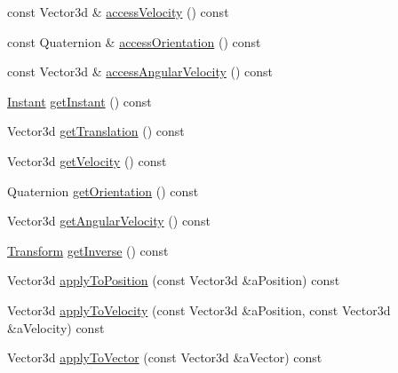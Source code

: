 \begin{DoxyCompactItemize}
\item 
const Vector3d \& \hyperlink{classlibrary_1_1physics_1_1coord_1_1_transform_a376d079de305b16e05251bfe84ca2199}{access\+Velocity} () const
\item 
const Quaternion \& \hyperlink{classlibrary_1_1physics_1_1coord_1_1_transform_aac7f3bf9570d378aab4e9c62f3478560}{access\+Orientation} () const
\item 
const Vector3d \& \hyperlink{classlibrary_1_1physics_1_1coord_1_1_transform_a0e7dc9e3c40a5e3b836ccb10e250d207}{access\+Angular\+Velocity} () const
\item 
\hyperlink{classlibrary_1_1physics_1_1time_1_1_instant}{Instant} \hyperlink{classlibrary_1_1physics_1_1coord_1_1_transform_a674c8ac4676d07aa641b85e049233838}{get\+Instant} () const
\item 
Vector3d \hyperlink{classlibrary_1_1physics_1_1coord_1_1_transform_a9cdc57080aff638c321de68564bf913b}{get\+Translation} () const
\item 
Vector3d \hyperlink{classlibrary_1_1physics_1_1coord_1_1_transform_aa5d6b48208919b34cdafb9ea56aaef12}{get\+Velocity} () const
\item 
Quaternion \hyperlink{classlibrary_1_1physics_1_1coord_1_1_transform_a401692acc8f82e03373feed88c6d45b2}{get\+Orientation} () const
\item 
Vector3d \hyperlink{classlibrary_1_1physics_1_1coord_1_1_transform_a06059603f73cc34da4cd1d731e1c09fa}{get\+Angular\+Velocity} () const
\item 
\hyperlink{classlibrary_1_1physics_1_1coord_1_1_transform}{Transform} \hyperlink{classlibrary_1_1physics_1_1coord_1_1_transform_a4d2cbec2ec7dadd2b4f8dd1d4184b692}{get\+Inverse} () const
\item 
Vector3d \hyperlink{classlibrary_1_1physics_1_1coord_1_1_transform_ae55f2f7fc9769d42ac31f9e5fd0ddfe5}{apply\+To\+Position} (const Vector3d \&a\+Position) const
\item 
Vector3d \hyperlink{classlibrary_1_1physics_1_1coord_1_1_transform_a017c1ec77f5ddda3f7d93dd63a9a6d3f}{apply\+To\+Velocity} (const Vector3d \&a\+Position, const Vector3d \&a\+Velocity) const
\item 
Vector3d \hyperlink{classlibrary_1_1physics_1_1coord_1_1_transform_a0709a5af7a97adbda05a24b9d4ad677d}{apply\+To\+Vector} (const Vector3d \&a\+Vector) const
\end{DoxyCompactItemize}
